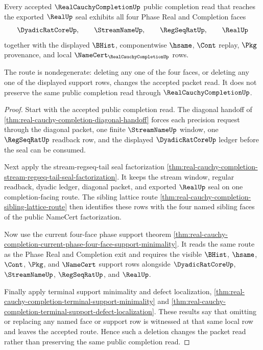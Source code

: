 \begin{theorem}
\label{thm:real-cauchy-completion-four-face-support-nondegeneracy}
Every accepted $\RealCauchyCompletionUp$ public completion read that reaches the exported $\RealUp$ seal exhibits all four Phase Real and Completion faces
$$
\begin{gathered}
\DyadicRatCoreUp,\qquad \StreamNameUp,\qquad \RegSeqRatUp,\qquad \RealUp
\end{gathered}
$$
together with the displayed $\BHist$, componentwise $\hsame$, $\Cont$ replay, $\Pkg$ provenance, and local $\NameCert_{\RealCauchyCompletionUp}$ rows.

The route is nondegenerate: deleting any one of the four faces, or deleting any one of the displayed support rows, changes the accepted packet read. It does not preserve the same public completion read through $\RealCauchyCompletionUp$.
\end{theorem}
\begin{proof}
Start with the accepted public completion read. The diagonal handoff of \autoref{thm:real-cauchy-completion-diagonal-handoff} forces each precision request through the diagonal packet, one finite $\StreamNameUp$ window, one $\RegSeqRatUp$ readback row, and the displayed $\DyadicRatCoreUp$ ledger before the seal can be consumed.

Next apply the stream-regseq-tail seal factorization \autoref{thm:real-cauchy-completion-stream-regseq-tail-seal-factorization}. It keeps the stream window, regular readback, dyadic ledger, diagonal packet, and exported $\RealUp$ seal on one completion-facing route. The sibling lattice route \autoref{thm:real-cauchy-completion-sibling-lattice-route} then identifies these rows with the four named sibling faces of the public NameCert factorization.

Now use the current four-face phase support theorem \autoref{thm:real-cauchy-completion-current-phase-four-face-support-minimality}. It reads the same route as the Phase Real and Completion exit and requires the visible $\BHist$, $\hsame$, $\Cont$, $\Pkg$, and $\NameCert$ support rows alongside $\DyadicRatCoreUp$, $\StreamNameUp$, $\RegSeqRatUp$, and $\RealUp$.

Finally apply terminal support minimality and defect localization, \autoref{thm:real-cauchy-completion-terminal-support-minimality} and \autoref{thm:real-cauchy-completion-terminal-support-defect-localization}. These results say that omitting or replacing any named face or support row is witnessed at that same local row and leaves the accepted route. Hence such a deletion changes the packet read rather than preserving the same public completion read.
\end{proof}

